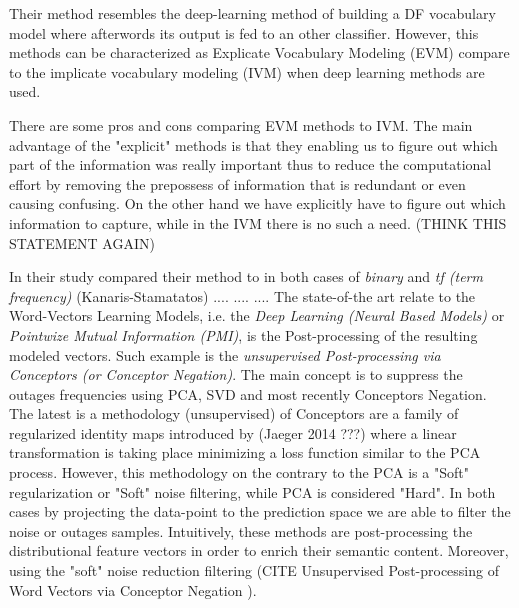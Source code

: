 Their method resembles the deep-learning method of building a DF vocabulary model where afterwords its output is fed to an other classifier. However, this methods can be characterized as Explicate Vocabulary Modeling (EVM) compare to the implicate vocabulary modeling (IVM) when deep learning methods are used.

There are some pros and cons comparing EVM methods to IVM. The main advantage of the "explicit" methods is that they enabling us to figure out which part of the information was really important thus to reduce the computational effort by removing the prepossess of information that is redundant or even causing confusing. On the other hand we have explicitly have to figure out which information to capture, while in the IVM there is no such a need. (THINK THIS STATEMENT AGAIN)

In their study compared their method to in both cases of \textit{binary} and \textit{tf (term frequency)} (Kanaris-Stamatatos)
....
....
....
The state-of-the art relate to the Word-Vectors Learning Models, i.e. the \textit{Deep Learning (Neural Based Models)} or \textit{Pointwize Mutual Information (PMI)}, is the Post-processing of the resulting modeled vectors. Such example is the \textit{unsupervised Post-processing via Conceptors (or Conceptor Negation)}. The main concept is to suppress the outages frequencies using PCA, SVD and most recently Conceptors Negation. The latest is a methodology (unsupervised) of Conceptors are a family of regularized identity maps introduced by (Jaeger 2014 ???) where a linear transformation is taking place minimizing a loss function similar to the PCA process. However, this methodology on the contrary to the PCA is a "Soft" regularization or "Soft" noise filtering, while PCA is considered "Hard". In both cases by projecting the data-point to the prediction space we are able to filter the noise or outages samples. Intuitively, these methods are post-processing the distributional feature vectors in order to enrich their semantic content. Moreover, using the "soft" noise reduction filtering (CITE Unsupervised Post-processing of Word Vectors via Conceptor Negation ).

